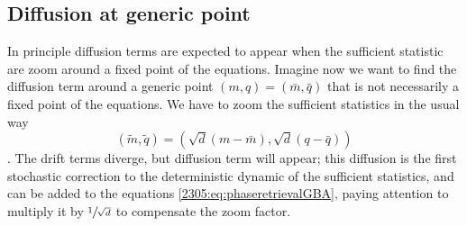 \subsection{Diffusion at generic point}
In principle diffusion terms are expected to appear when the sufficient statistic are zoom around a fixed point of the equations.
Imagine now we want to find the diffusion term around a generic point \((m,q) = (\bar m, \bar q)\) that is not necessarily a fixed point of the equations. We have to zoom the sufficient statistics in the usual way 
\[(\tilde m, \tilde q) = \left(\sqrt{d}(m-\bar m), \sqrt{d}(q-\bar q)\right)\].
The drift terms diverge, but diffusion term will appear; this diffusion is the first stochastic correction to the deterministic dynamic of the sufficient statistics, and can be added to the equations \eqref{2305:eq:phaseretrievalGBA}, paying attention to multiply it by \(\sfrac1{\sqrt{d}}\) to compensate the zoom factor.

